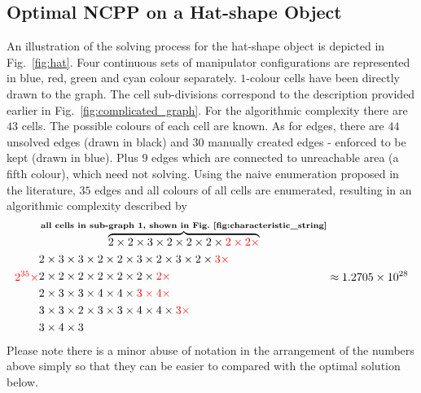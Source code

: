 \documentclass[journal]{IEEEtran}
\begin{document}
\subsection{Optimal NCPP on a Hat-shape Object}
An illustration of the solving process for the hat-shape object is depicted in Fig.~\ref{fig:hat}. 
Four continuous sets of manipulator configurations are represented in blue, red, green and cyan colour separately. $1$-colour cells have been directly drawn to the graph. 
The cell sub-divisions correspond to the description provided earlier in Fig.~\ref{fig:complicated_graph}.
For the algorithmic complexity there are $43$ cells. The possible colours of each cell are known. As for edges, there are $44$ unsolved edges (drawn in black) and $30$ manually created edges - enforced to be kept (drawn in blue). Plus $9$ edges which are connected to unreachable area (a fifth colour), which need not solving. Using the naive enumeration proposed in the literature, %
$35$ edges and all colours of all cells are enumerated, resulting in an algorithmic complexity described by 
\begin{equation}
{\color{red}2^{35}\times}
\begin{aligned}
&\overbrace{2\times2\times3\times2\times2\times2\times{\color{red}2\times2\times}}^{\textbf{all cells in sub-graph 1, shown in Fig.~\ref{fig:characteristic_string}}}\\
&2\times3\times3\times2\times2\times3\times2\times3\times2\times{\color{red}3\times}\\
&2\times2\times2\times2\times2\times2\times{\color{red}2\times}\\
&2\times3\times3\times4\times4\times{\color{red}3\times4\times}\\
&3\times3\times2\times3\times3\times4\times4\times{\color{red}3\times}\\
&3\times4\times3
\end{aligned}
\approx 1.2705\times10^{28}
\end{equation}
Please note there is a minor abuse of notation in the arrangement of the numbers above simply so that they can be easier to compared with the optimal solution below. 
\end{document}
